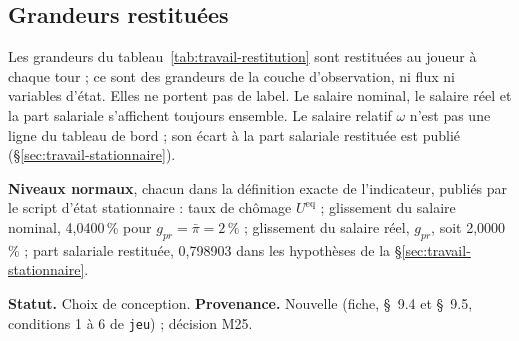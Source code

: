 \documentclass[11pt,a4paper]{article}
\begin{document}
\subsection{Grandeurs restituées}
\label{sec:travail-restitution}
\begin{proposee}
Les grandeurs du tableau~\ref{tab:travail-restitution} sont restituées au joueur à chaque tour ; ce sont des grandeurs de la couche d'observation, ni flux ni variables d'état. Elles ne portent pas de label. Le salaire nominal, le salaire réel et la part salariale s'affichent toujours ensemble. Le salaire relatif $\omega$ n'est pas une ligne du tableau de bord ; son écart à la part salariale restituée est publié (\S\ref{sec:travail-stationnaire}).

\textbf{Niveaux normaux}, chacun dans la définition exacte de l'indicateur, publiés par le script d'état stationnaire : taux de chômage $U^{\mathrm{eq}}$ ; glissement du salaire nominal, 4,0400\,\% pour $g_{\mathit{pr}} = \bar\pi = 2\,\%$ ; glissement du salaire réel, $g_{\mathit{pr}}$, soit 2,0000\,\% ; part salariale restituée, 0,798903 dans les hypothèses de la \S\ref{sec:travail-stationnaire}.

\textbf{Statut.} Choix de conception. \textbf{Provenance.} Nouvelle (fiche, \S~9.4 et \S~9.5, conditions 1 à 6 de \texttt{jeu}) ; décision M25.
\end{proposee}
\end{document}
